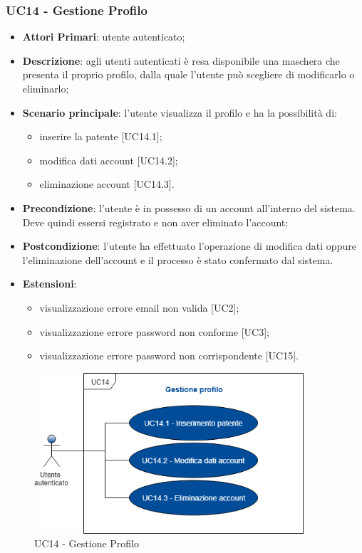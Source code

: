 \subsubsection{UC14 - Gestione Profilo}
\begin{itemize}
	\item \textbf{Attori Primari}: utente autenticato;
	\item \textbf{Descrizione}: agli utenti autenticati è resa disponibile una maschera che presenta il proprio profilo, dalla quale l'utente può scegliere di modificarlo o eliminarlo;
	\item \textbf{Scenario principale}: l'utente visualizza il profilo e ha la possibilità di: 
	\begin{itemize}
		\item inserire la patente [UC14.1];
		\item modifica dati account [UC14.2];
		\item eliminazione account [UC14.3].
	\end{itemize}
	\item \textbf{Precondizione}: l'utente è in possesso di un account all'interno del sistema. Deve quindi essersi registrato e non aver eliminato l'account;
	\item \textbf{Postcondizione}: l'utente ha effettuato l'operazione di modifica dati oppure l'eliminazione dell'account e il processo è stato confermato dal sistema.
	\item \textbf{Estensioni}:
	\begin{itemize}
		\item visualizzazione errore email non valida [UC2];
		\item visualizzazione errore password non conforme [UC3];
		\item visualizzazione errore password non corrispondente [UC15].
	\end{itemize}
\end{itemize}
\begin{figure}[h]
	\includegraphics[width=10cm]{res/images/UC14Profilo.png}
	\centering
	\caption{UC14 - Gestione Profilo}
\end{figure}
